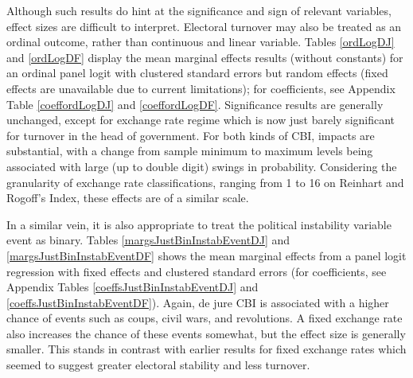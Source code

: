 \documentclass{article}
\begin{document}
    Although such results do hint at the significance and sign of relevant variables, effect sizes are difficult to interpret. Electoral turnover may also be treated as an ordinal outcome, rather than continuous and linear variable. Tables \ref{ordLogDJ} and \ref{ordLogDF}  display the mean marginal effects results (without constants) for an ordinal panel logit with clustered standard errors but random effects (fixed effects are unavailable due to current limitations); for coefficients, see Appendix Table \ref{coeffordLogDJ} and \ref{coeffordLogDF}. Significance results are generally unchanged, except for exchange rate regime which is now just barely significant for turnover in the head of government. For both kinds of CBI, impacts are substantial, with a change from sample minimum to maximum levels being associated with large (up to double digit) swings in probability. Considering the granularity of exchange rate classifications, ranging from 1 to 16 on Reinhart and Rogoff’s Index, these effects are of a similar scale.

    
    

    In a similar vein, it is also appropriate to treat the political instability variable event as binary. Tables \ref*{margsJustBinInstabEventDJ} and \ref*{margsJustBinInstabEventDF} shows the mean marginal effects from a panel logit regression with fixed effects and clustered standard errors (for coefficients, see Appendix Tables \ref*{coeffsJustBinInstabEventDJ} and \ref{coeffsJustBinInstabEventDF}). Again, de jure CBI is associated with a higher chance of events such as coups, civil wars, and revolutions. A fixed exchange rate also increases the chance of these events somewhat, but the effect size is generally smaller. This stands in contrast with earlier results for fixed exchange rates which seemed to suggest greater electoral stability and less turnover.

    
    
\end{document}

